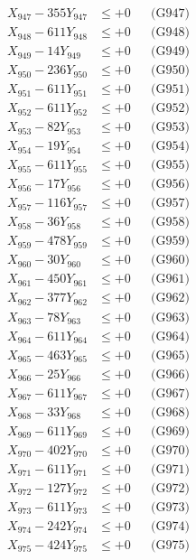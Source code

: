 \documentclass[a4paper,10pt]{article}
\begin{document}
{\begin{align}
X_{947} - 355Y_{947} &\leq +0 && \text{(G947)} \\
X_{948} - 611Y_{948} &\leq +0 && \text{(G948)} \\
X_{949} - 14Y_{949} &\leq +0 && \text{(G949)} \\
X_{950} - 236Y_{950} &\leq +0 && \text{(G950)} \\
\allowbreak
X_{951} - 611Y_{951} &\leq +0 && \text{(G951)} \\
X_{952} - 611Y_{952} &\leq +0 && \text{(G952)} \\
X_{953} - 82Y_{953} &\leq +0 && \text{(G953)} \\
X_{954} - 19Y_{954} &\leq +0 && \text{(G954)} \\
X_{955} - 611Y_{955} &\leq +0 && \text{(G955)} \\
X_{956} - 17Y_{956} &\leq +0 && \text{(G956)} \\
X_{957} - 116Y_{957} &\leq +0 && \text{(G957)} \\
X_{958} - 36Y_{958} &\leq +0 && \text{(G958)} \\
X_{959} - 478Y_{959} &\leq +0 && \text{(G959)} \\
X_{960} - 30Y_{960} &\leq +0 && \text{(G960)} \\
\allowbreak
X_{961} - 450Y_{961} &\leq +0 && \text{(G961)} \\
X_{962} - 377Y_{962} &\leq +0 && \text{(G962)} \\
X_{963} - 78Y_{963} &\leq +0 && \text{(G963)} \\
X_{964} - 611Y_{964} &\leq +0 && \text{(G964)} \\
X_{965} - 463Y_{965} &\leq +0 && \text{(G965)} \\
X_{966} - 25Y_{966} &\leq +0 && \text{(G966)} \\
X_{967} - 611Y_{967} &\leq +0 && \text{(G967)} \\
X_{968} - 33Y_{968} &\leq +0 && \text{(G968)} \\
X_{969} - 611Y_{969} &\leq +0 && \text{(G969)} \\
X_{970} - 402Y_{970} &\leq +0 && \text{(G970)} \\
\allowbreak
X_{971} - 611Y_{971} &\leq +0 && \text{(G971)} \\
X_{972} - 127Y_{972} &\leq +0 && \text{(G972)} \\
X_{973} - 611Y_{973} &\leq +0 && \text{(G973)} \\
X_{974} - 242Y_{974} &\leq +0 && \text{(G974)} \\
X_{975} - 424Y_{975} &\leq +0 && \text{(G975)} \\

\end{align}}
\end{document}
